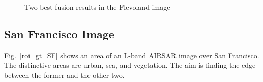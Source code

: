 \documentclass[journal]{IEEEtran}
\begin{document}
\begin{figure}[hbt]
	\centering
	\caption{Two best fusion results in the Flevoland image}
	\label{fusion_flev_met}
\end{figure}


\subsection{San Francisco Image}

Fig.~\ref{roi_gt_SF} shows an area of an L-band AIRSAR image over San Francisco.
The distinctive areas are urban, sea, and vegetation.
The aim is finding the edge between the former and the other two.
\end{document}
